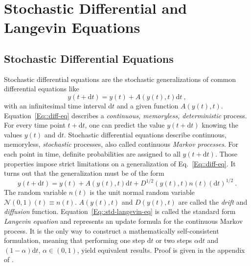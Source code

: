	\section{Stochastic Differential and Langevin Equations}
	\subsection{Stochastic Differential Equations}
	Stochastic differential equations are the stochastic generalizations of common differential equations like
	\begin{equation} \label{Eq::diff-eq}
		y(t + \text{d}t) =	y(t) + A(y(t), t) \mathrm{d}t ~,
	\end{equation}
	with an  infinitesimal time interval $\text{d}t$ and a given function $A(y(t), t)$. Equation~\eqref{Eq::diff-eq} describes a \textit{continuous, memoryless, deterministic} process. For every time point $t + \text{d}t$, one can predict the value $y(t+\text{d}t)$ knowing the values $y(t)$ and $\text{d}t$. Stochastic differential equations describe continuous, memoryless, \textit{stochastic} processes, also called continuous \textit{Markov processes}. For each point in time, definite probabilities are assigned to all $y(t + \text{d}t)$. Those properties impose strict limitations on a generalization of Eq.~\eqref{Eq::diff-eq}. It turns out that the generalization must be of the form
	\begin{equation} \label{Eq::std-langevin-eq}
		y(t + \text{d}t) =	y(t) + A(y(t), t) \text{d}t + D^{1/2} \left(y(t), t\right) n(t) (\text{d}t)^{1/2}~.
	\end{equation}
	The random variable $n(t)$ is the unit normal random variable  $\mathcal{N}(0,1)(t) \equiv n(t)$. $A(y(t), t)$ and $D(y(t), t)$ are called the \textit{drift} and \textit{diffusion} function. Equation~\eqref{Eq::std-langevin-eq} is called the standard form \textit{Langevin equation} and represents an update formula for the continuous Markov process. It is the only way to construct a mathematically self-consistent formulation, meaning that performing one step $\text{d}t$ or two steps $\alpha \text{d}t$ and $(1 - \alpha)\text{d}t$, $\alpha \in (0, 1)$, yield equivalent results. Proof is given in the appendix of \cite{gillespie1996mathematics}. \\
	
